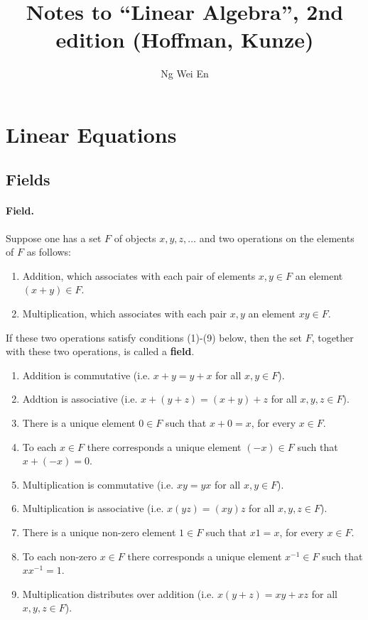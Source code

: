 \documentclass{article}
\title{Notes to ``Linear Algebra'', 2nd edition (Hoffman, Kunze)}
\author{Ng Wei En}
\begin{document}
\maketitle
\tableofcontents
\newpage

\section{Linear Equations}

\subsection{Fields}

\paragraph{Field.} Suppose one has a set $F$ of objects $x, y, z, \ldots$ and
two operations on the elements of $F$ as follows:

\begin{enumerate}
  \item Addition, which associates with each pair of elements $x, y \in F$ an
    element $(x + y) \in F$.
  \item Multiplication, which associates with each pair $x, y$ an element $xy
    \in F$.
\end{enumerate}

If these two operations satisfy conditions (1)-(9) below, then the set $F$,
together with these two operations, is called a \textbf{field}.

\begin{enumerate}
  \item Addition is commutative (i.e. $x + y = y + x$ for all $x, y \in F$).
  \item Addtion is associative (i.e. $x + (y + z) = (x + y) + z$ for all $x, y,
    z \in F$).
  \item There is a unique element $0 \in F$ such that $x + 0 = x$, for every $x
    \in F$.
  \item To each $x \in F$ there corresponds a unique element $(-x) \in F$ such
    that $x + (-x) = 0$.
  \item Multiplication is commutative (i.e. $xy = yx$ for all $x, y \in F$).
  \item Multiplication is associative (i.e. $x(yz) = (xy)z$ for all $x, y, z
    \in F$).
  \item There is a unique non-zero element $1 \in F$ such that $x1 = x$, for
    every $x \in F$.
  \item To each non-zero $x \in F$ there corresponds a unique element $x^{-1}
    \in F$ such that $xx^{-1} = 1$.
  \item Multiplication distributes over addition (i.e. $x(y + z) = xy + xz$ for
    all $x, y, z \in F$).
\end{enumerate}
\end{document}
